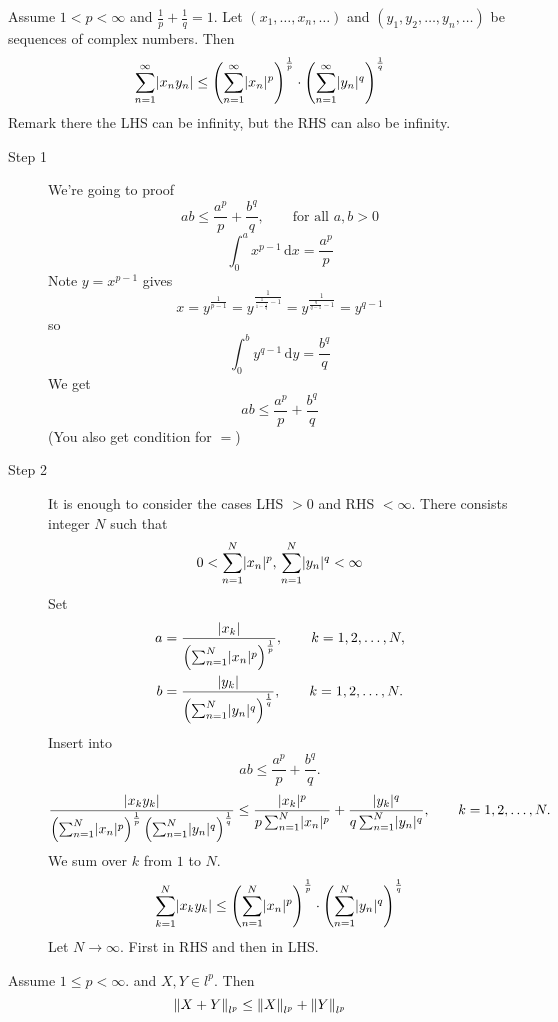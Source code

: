 \begin{theorem*}
	Assume $1<p<\infty$ and $\frac{1}{p}+ \frac{1}{q}=1$. Let $(x_1, \dots, x_n, \dots)$ and $(y_1,y_2, \dots, y_n, \dots)$ be sequences of complex numbers. Then
	\[
		\sum_{n=1}^{\infty}\lvert x_ny_n\rvert 
		\leq \left( \sum_{n=1}^{\infty}\lvert x_n\rvert^p \right)^{\frac{1}{p}} \cdot \left( \sum_{n=1}^{\infty}\lvert y_n\rvert^q \right)^{\frac{1}{q}}
	\]
	Remark there the LHS can be infinity, but the RHS can also be infinity.
\end{theorem*}
\begin{beweis}
	\begin{description}
		\item[Step 1] We're going to proof 
		\[
			ab \leq \frac{a^p}{p}+ \frac{b^q}{q}, \qquad \text{for all }a,b >0
		\] 
		\[
			\int_{0}^{a} x^{p-1} \,\mathrm{d}x = \frac{a^p}{p}
		\]
		Note $y = x^{p-1}$ gives \[
			x  = y ^{\frac{1}{p-1}} = y^{\frac{1}{\frac{1}{1-\frac{1}{q}}-1}}= y ^{\frac{1}{\frac{q}{q-1}-1}} = y^{q-1}
		\] 
		so
		\[
			\int_{0}^{b}y^{q-1} \,\mathrm{d}y = \frac{b^q}{q}
		\]
		We get
		\[
			ab \leq \frac{a^p}{p}+ \frac{b^q}{q}
		\]
		(You also get condition for $=$)
		\item[Step 2] It is enough to consider the cases LHS $>0$ and RHS $< \infty$. There consists integer $N$ such that
		\[
			0 < \sum_{n=1}^{N}\lvert x_n\rvert^p, \, \sum_{n=1}^{N}\lvert y_n\rvert^q < \infty
		\]
		Set 
		\begin{align*}
			a &= \frac{\lvert x_k\rvert}{\left( \sum_{n=1}^{N}\lvert x_n\rvert^p \right)^{\frac{1}{p}}}, \qquad k = 1,2, \dots,N, \\
			b &= \frac{\lvert y_k\rvert}{\left( \sum_{n=1}^{N}\lvert y_n\rvert^q \right)^{\frac{1}{q}}}, \qquad k = 1,2, \dots,N.
		\end{align*}
		Insert into
		\[
			ab \leq \frac{a^p}{p}+ \frac{b^q}{q}.
		\]
		\[
			\frac{\lvert x_ky_k\rvert}{\left( \sum_{n=1}^{N}\lvert x_n\rvert^p \right)^{\frac{1}{p}}\left( \sum_{n=1}^{N}\lvert y_n\rvert^q \right)^{\frac{1}{q}}} 
			\leq \frac{\lvert x_k\rvert^p}{p \sum_{n=1}^{N}\lvert x_n\rvert^p} + \frac{\lvert y_k\rvert^q}{q \sum_{n=1}^{N}\lvert y_n\rvert^q}, \qquad k = 1,2, \dots, N.
		\]
		We sum over $k$ from $1$ to $N$.
		\[
			\sum_{k=1}^{N}\lvert x_ky_k\rvert \leq  \left( \sum_{n=1}^{N}\lvert x_n\rvert^p \right)^{\frac{1}{p}} \cdot \left( \sum_{n=1}^{N}\lvert y_n\rvert^q \right)^{\frac{1}{q}}
		\]
		Let $N \to \infty$. First in RHS and then in LHS. 
	\end{description}
\end{beweis}
\begin{theorem*}
	Assume $1 \leq p < \infty$. and $X,Y \in l^p$. Then
	\[
		\norm{X+Y}_{l^p} \leq \norm{X}_{l^p} + \norm{Y}_{l^p}
	\]
\end{theorem*}
